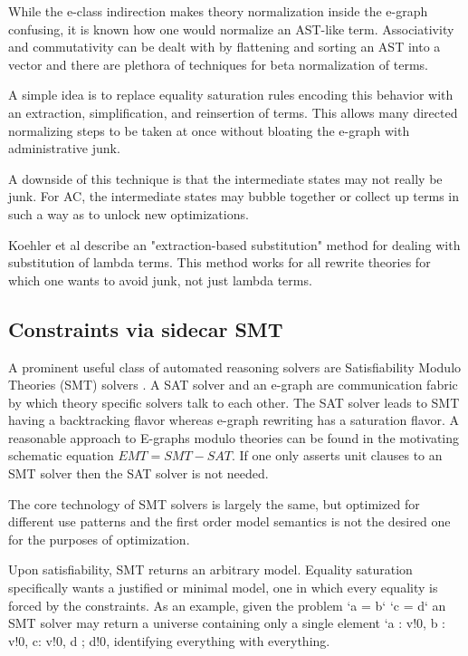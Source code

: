 While the e-class indirection makes theory normalization inside the e-graph confusing, it is known how one would normalize an AST-like term. 
Associativity and commutativity can be dealt with by flattening and sorting an AST into a vector and there are plethora of techniques for beta normalization of terms.

A simple idea is to replace equality saturation rules encoding this behavior with an extraction, simplification, and reinsertion of terms. This allows many directed normalizing steps to be taken at once without bloating the e-graph with administrative junk.

A downside of this technique is that the intermediate states may not really be junk. For AC, the intermediate states may bubble together or collect up terms in such a way as to unlock new optimizations.

Koehler et al describe an "extraction-based substitution" \cite{koehler2022sketchguidedequalitysaturationscaling} method for dealing with substitution of lambda terms. This method works for all rewrite theories for which one wants to avoid junk, not just lambda terms.

\subsection{Constraints via sidecar SMT}

A prominent useful class of automated reasoning solvers are Satisfiability Modulo Theories (SMT) solvers \cite{Barrett2018}. A SAT solver and an e-graph are communication fabric by which theory specific solvers talk to each other. The SAT solver leads to SMT having a backtracking flavor whereas e-graph rewriting has a saturation flavor. A reasonable approach to E-graphs modulo theories can be found in the motivating schematic equation $EMT = SMT - SAT$. If one only asserts unit clauses to an SMT solver then the SAT solver is not needed.

The core technology of SMT solvers is largely the same, but optimized for different use patterns and the first order model semantics is not the desired one for the purposes of optimization.

Upon satisfiability, SMT returns an arbitrary model. Equality saturation specifically wants a justified or minimal model, one in which every equality is forced by the constraints. As an example, given the problem `a = b` `c = d` an SMT solver may return a universe containing only a single element `{a : v!0, b : v!0, c: v!0, d ; d!0}, identifying everything with everything.

